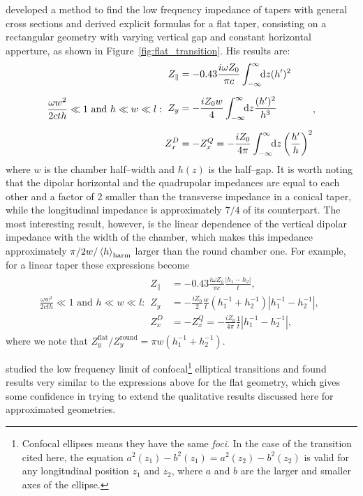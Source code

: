      developed a method to find the low frequency impedance of tapers with general cross sections and derived explicit formulas for a flat taper, consisting on a rectangular geometry with varying vertical gap and constant horizontal apperture, as shown in Figure~\ref{fig:flat_transition}. His results are:
    \begin{subequations}\label{eq:flat_transitions}
        \begin{align}
            \frac{\omega w^2}{2cth}\ll1\,\,\text{and}\,\,h\ll w\ll l:
            \begin{aligned}
                Z_\parallel &= -0.43\frac{i \omega Z_0}{\pi c}\infint{z}{(h')^2}\\[2mm]
                Z_y &= -\frac{i Z_0w}{4}\infint{z}{\frac{(h')^2}{h^3}}\\[2mm]
                Z_x^D&= -Z_x^Q= -\frac{i Z_0}{4\pi}\infint{z}{\fof{\frac{h'}{h}}^2}
            \end{aligned},
        \end{align}
    \end{subequations}
    where $w$ is the chamber half--width and $h(z)$ is the half--gap. It is worth noting that the dipolar horizontal and the quadrupolar impedances are equal to each other and a factor of 2 smaller than the transverse impedance in a conical taper, while the longitudinal impedance is approximately $7/4$ of its counterpart. The most interesting result, however, is the linear dependence of the vertical dipolar impedance with the width of the chamber, which makes this impedance approximately $\pi/2w/\average[\text{harm}]{h}$ larger than the round chamber one. For example, for a linear taper these expressions become
    \begin{align}
        \frac{\omega w^2}{2cth}\ll1\,\,\text{and}\,\,h\ll w\ll l:
        \begin{aligned}
        Z_\parallel &= -0.43\frac{i \omega Z_0}{\pi c}\frac{|h_1-h_2|}{t},\\[2mm]
        Z_y &= -\frac{i Z_0}{2}\frac{w}{t}(h_1^{-1}+h_2^{-1})|h_1^{-1}-h_2^{-1}|,\\[2mm]
        Z_x^D&= -Z_x^Q= -\frac{i Z_0}{4\pi}\frac1t|h_1^{-1}-h_2^{-1}|,
        \end{aligned}
    \end{align}
    where we note that $Z_y^\text{flat}/Z_y^\text{round} = \pi w(h_1^{-1}+h_2^{-1})$.

     studied the low frequency limit of confocal\footnote{Confocal ellipses means they have the same \emph{foci}. In the case of the transition cited here, the equation $a^2(z_1)-b^2(z_1)=a^2(z_2)-b^2(z_2)$ is valid for any longitudinal position $z_1$ and $z_2$, where $a$ and $b$ are the larger and smaller axes of the ellipse.} elliptical transitions and found results very similar to the expressions above for the flat geometry, which gives some confidence in trying to extend the qualitative results discussed here for approximated geometries.

